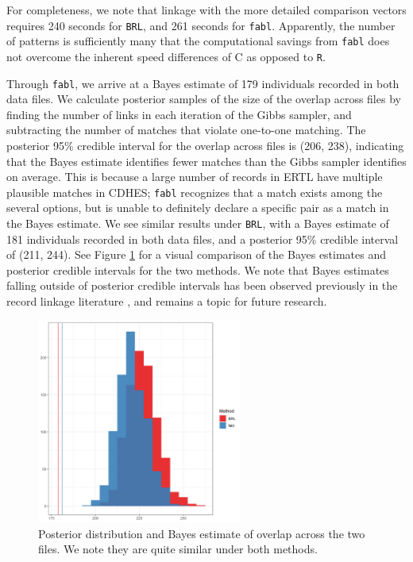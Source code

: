 \documentclass[ba]{imsart}
\begin{document}
	For completeness, we note that linkage with the more detailed comparison vectors requires 240 seconds for \texttt{BRL}, and 261 seconds for \texttt{fabl}.  Apparently, the number of patterns is sufficiently many that the computational savings from \texttt{fabl} does not overcome the inherent speed differences of C as opposed to \texttt{R}.
	
	Through \texttt{fabl}, we arrive at a Bayes estimate of 179 individuals recorded in both data files. We calculate posterior samples of the size of the overlap across files by finding the number of links in each iteration of the Gibbs sampler, and subtracting the number of matches that violate one-to-one matching. The posterior 95\% credible interval for the overlap across files is (206, 238), indicating that the Bayes estimate identifies fewer matches than the Gibbs sampler identifies on average. This is because a large number of records in ERTL have multiple plausible matches in CDHES; \texttt{fabl} recognizes that a match exists among the several options, but is unable to definitely declare a specific pair as a match in the Bayes estimate. We see similar results under \texttt{BRL}, with a Bayes estimate of 181 individuals recorded in both data files, and a posterior 95\% credible interval of (211, 244). See Figure \ref{fig:overlap-plot} for a visual comparison of the Bayes estimates and posterior credible intervals for the two methods. We note that Bayes estimates falling outside of posterior credible intervals has been observed previously in the record linkage literature \citep{sadinle_bayesian_2017, steorts_bayesian_2016}, and remains a topic for future research.
	

	
	\begin{figure}[t]
		\begin{center}
		         \includegraphics[width=0.6\textwidth]{finalFigures/el_salvador/overlap_distribution_smallP_bayes}
			\caption{Posterior distribution and Bayes estimate of overlap across the two files. We note they are quite similar under both methods.}
			\label{fig:overlap-plot}
		\end{center}
	\end{figure}
	
\end{document}
